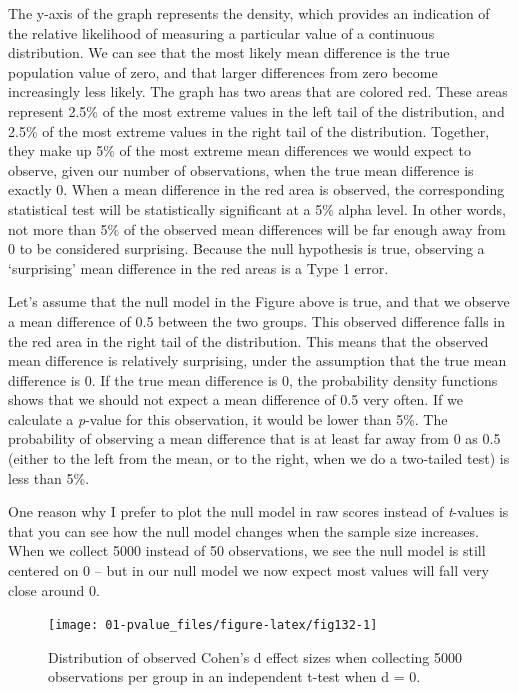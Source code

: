 \documentclass[
]{krantz}
\begin{document}
The y-axis of the graph represents the density, which provides an indication of the relative likelihood of measuring a particular value of a continuous distribution. We can see that the most likely mean difference is the true population value of zero, and that larger differences from zero become increasingly less likely. The graph has two areas that are colored red. These areas represent 2.5\% of the most extreme values in the left tail of the distribution, and 2.5\% of the most extreme values in the right tail of the distribution. Together, they make up 5\% of the most extreme mean differences we would expect to observe, given our number of observations, when the true mean difference is exactly 0. When a mean difference in the red area is observed, the corresponding statistical test will be statistically significant at a 5\% alpha level. In other words, not more than 5\% of the observed mean differences will be far enough away from 0 to be considered surprising. Because the null hypothesis is true, observing a `surprising' mean difference in the red areas is a Type 1 error.

Let's assume that the null model in the Figure above is true, and that we observe a mean difference of 0.5 between the two groups. This observed difference falls in the red area in the right tail of the distribution. This means that the observed mean difference is relatively surprising, under the assumption that the true mean difference is 0. If the true mean difference is 0, the probability density functions shows that we should not expect a mean difference of 0.5 very often. If we calculate a \emph{p}-value for this observation, it would be lower than 5\%. The probability of observing a mean difference that is at least far away from 0 as 0.5 (either to the left from the mean, or to the right, when we do a two-tailed test) is less than 5\%.

One reason why I prefer to plot the null model in raw scores instead of \emph{t}-values is that you can see how the null model changes when the sample size increases. When we collect 5000 instead of 50 observations, we see the null model is still centered on 0 -- but in our null model we now expect most values will fall very close around 0.

\begin{figure}

{\centering \texttt{[image: 01-pvalue\_files/figure-latex/fig132-1]} 

}

\caption{Distribution of observed Cohen's d effect sizes when collecting 5000 observations per group in an independent t-test when d = 0.}\label{fig:fig132}
\end{figure}
\end{document}
